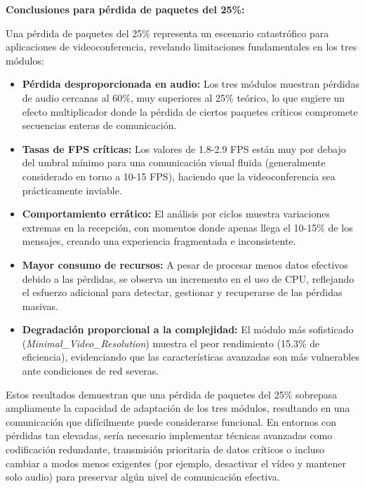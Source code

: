 \textbf{Conclusiones para pérdida de paquetes del 25\%:}

Una pérdida de paquetes del 25\% representa un escenario catastrófico para aplicaciones de videoconferencia, revelando limitaciones fundamentales en los tres módulos:

\begin{itemize}
    \item \textbf{Pérdida desproporcionada en audio:} Los tres módulos muestran pérdidas de audio cercanas al 60\%, muy superiores al 25\% teórico, lo que sugiere un efecto multiplicador donde la pérdida de ciertos paquetes críticos compromete secuencias enteras de comunicación.
    
    \item \textbf{Tasas de FPS críticas:} Los valores de 1.8-2.9 FPS están muy por debajo del umbral mínimo para una comunicación visual fluida (generalmente considerado en torno a 10-15 FPS), haciendo que la videoconferencia sea prácticamente inviable.
    
    \item \textbf{Comportamiento errático:} El análisis por ciclos muestra variaciones extremas en la recepción, con momentos donde apenas llega el 10-15\% de los mensajes, creando una experiencia fragmentada e inconsistente.
    
    \item \textbf{Mayor consumo de recursos:} A pesar de procesar menos datos efectivos debido a las pérdidas, se observa un incremento en el uso de CPU, reflejando el esfuerzo adicional para detectar, gestionar y recuperarse de las pérdidas masivas.
    
    \item \textbf{Degradación proporcional a la complejidad:} El módulo más sofisticado (\textit{Minimal\_Video\_Resolution}) muestra el peor rendimiento (15.3\% de eficiencia), evidenciando que las características avanzadas son más vulnerables ante condiciones de red severas.
\end{itemize}

Estos resultados demuestran que una pérdida de paquetes del 25\% sobrepasa ampliamente la capacidad de adaptación de los tres módulos, resultando en una comunicación que difícilmente puede considerarse funcional. En entornos con pérdidas tan elevadas, sería necesario implementar técnicas avanzadas como codificación redundante, transmisión prioritaria de datos críticos o incluso cambiar a modos menos exigentes (por ejemplo, desactivar el vídeo y mantener solo audio) para preservar algún nivel de comunicación efectiva.

